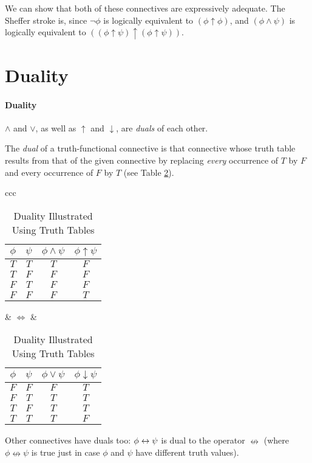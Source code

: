 We can show that both of these connectives are expressively adequate. The  Sheffer stroke is, since $\neg \phi$ is logically equivalent to $(\phi\uparrow\phi)$, and $(\phi \wedge \psi)$ is logically equivalent to  $((\phi\uparrow\psi)\uparrow(\phi\uparrow\psi))$.


\section{Duality}
\paragraph{Duality}

$\wedge$ and $\vee$, as well as $\uparrow$ and $\downarrow$, are \emph{duals} of each other. 

\begin{definition}[Duality]
The \emph{dual} of a truth-functional connective is that connective whose truth table
results from that of the given connective by replacing \emph{every} occurrence
of $T$ by $F$ and every occurrence of $F$ by $T$ (see Table \ref{tthree}).
\end{definition}
\begin{table}\centering\begin{tabular}{ccc}
{    \begin{tabular}{cc|c|c}
\toprule
$\phi$ & $\psi$ & $\phi \wedge \psi$ & $\phi \uparrow \psi$ \\
\midrule
$T$ & $T$ & $T$ &$F$\\
$T$ & $F$ & $F$&$F$\\
$F$ & $T$ & $F$ &$F$\\
$F$ & $F$ & $F$ &$T$\\
\bottomrule
	\end{tabular}} &
$\Leftrightarrow$ &
{	\begin{tabular}{cc|c|c}
$\phi$ & $\psi$ & $\phi \vee \psi$ & $\phi\downarrow\psi$ \\
\hline
$F$ & $F$ & $F$ &$T$\\
$F$ & $T$ & $T$ &$T$\\
$T$ & $F$ & $T$ &$T$\\
$T$ & $T$ & $T$	&$F$
\end{tabular}
}    \end{tabular}\caption{Duality Illustrated Using Truth Tables\label{tthree}}\end{table}
Other connectives have duals too: $\phi \leftrightarrow \psi$ is dual to the operator $\nleftrightarrow$ (where $\phi \nleftrightarrow\psi$ is true just
in case $\phi$ and $\psi$ have different truth values).


